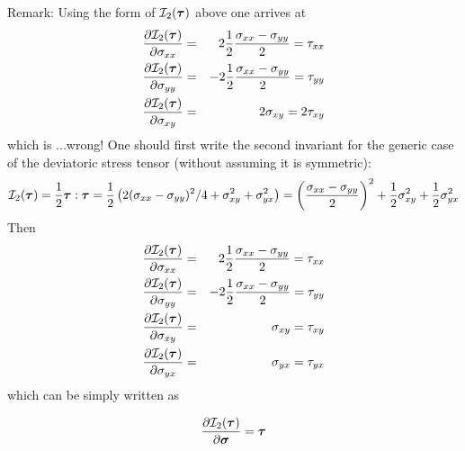 Remark: Using the form of ${\cal I}_2(\bm\tau)$ above one arrives at  
\begin{eqnarray}
\frac{\partial {\cal I}_2(\bm\tau)}{\partial \sigma_{xx}} 
&=&  2 \frac{1}{2}  \frac{\sigma_{xx}-\sigma_{yy}}{2} = \tau_{xx}\nonumber \\
\frac{\partial {\cal I}_2(\bm\tau)}{\partial \sigma_{yy}} 
&=& -2 \frac{1}{2}  \frac{\sigma_{xx}-\sigma_{yy}}{2} = \tau_{yy} \nonumber\\
\frac{\partial {\cal I}_2(\bm\tau)}{\partial \sigma_{xy}} 
&=& 2 \sigma_{xy} =  2 \tau_{xy}\nonumber
\end{eqnarray}
which is ...wrong! One should first write the second invariant 
for the generic case of the deviatoric stress tensor (without 
assuming it is symmetric):
\[
{\cal I}_2(\bm\tau) = \frac12 \bm\tau:\bm\tau
= \frac12 \left( 2 (\sigma_{xx}-\sigma_{yy})^2/4 + \sigma_{xy}^2 + \sigma_{yx}^2 \right)
= \left(\frac{\sigma_{xx}-\sigma_{yy}}{2} \right)^2 + \frac12\sigma_{xy}^2 + \frac12\sigma_{yx}^2
\]
Then
\begin{eqnarray}
\frac{\partial {\cal I}_2(\bm\tau)}{\partial \sigma_{xx}} 
&=&  2 \frac{1}{2}  \frac{\sigma_{xx}-\sigma_{yy}}{2} = \tau_{xx} \nonumber\\
\frac{\partial {\cal I}_2(\bm\tau)}{\partial \sigma_{yy}} 
&=& -2 \frac{1}{2}  \frac{\sigma_{xx}-\sigma_{yy}}{2} =  \tau_{yy} \nonumber\\
\frac{\partial {\cal I}_2(\bm\tau)}{\partial \sigma_{xy}} 
&=&  \sigma_{xy} =  \tau_{xy} \nonumber\\
\frac{\partial {\cal I}_2(\bm\tau)}{\partial \sigma_{yx}} 
&=&  \sigma_{yx} =  \tau_{yx} \nonumber
\end{eqnarray}
which can be simply written as
\begin{mdframed}[backgroundcolor=blue!5]
\[
\frac{\partial {\cal I}_2(\bm\tau)}{\partial \bm\sigma} 
=\bm\tau
\]
\end{mdframed}



















